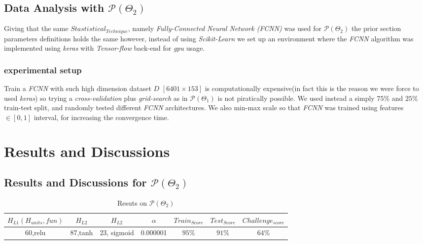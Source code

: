 \subsection{Data Analysis with $\mathcal{P}(\Theta_{2})$}

Giving that the same $Stastistical_{Technique}$, namely \emph{Fully-Connected Neural Network (FCNN)} was used for  $\mathcal{P}(\Theta_{2})$ the prior section parameters definitions holds the same however, instead of using \emph{Scikit-Learn} we set up an environment where the \emph{FCNN} algorithm was implemented using \emph{keras} with \emph{Tensor-flow} back-end for \emph{gpu} usage.

\subsubsection{experimental setup}
Train a \emph{FCNN} with such high dimension dataset $D$ $[6401 \times 153]$ is computationally expensive(in fact this is the reason we were force to used \emph{keras}) so trying a \emph{cross-validation} plus  \emph{grid-search} as in   $\mathcal{P}(\Theta_{1})$ is not piratically possible. We used instead a simply $75\%$ and $25\%$ train-test split, and randomly tested different \emph{FCNN} architectures. We also min-max scale so that \emph{FCNN} was trained using features $\in [0,1]$ interval, for increasing the convergence time.



\section{Results and Discussions}

\subsection{Results and Discussions for  $\mathcal{P}(\Theta_{2})$}

\begin{table}[h!]
	\begin{center}
		\begin{tabular}{||c c c c c c c||} 
			\hline
			$H_{L1}(H_{units},fun)$&$H_{L2}$&$H_{L2}$& $\alpha$ & $Train_{Score}$ & $Test_{Score}$  & $Challenge_{score}$  \\ [0.5ex] 
			\hline
			60,relu
			&
			87,tanh
			&
			23, sigmoid
			&0.000001& $95\%$ & $91\%$ & $64\%$  \\ 
			\hline
		\end{tabular}
		\caption{Resuts on $\mathcal{P}(\Theta_{2})$}
		\label{table:p2_result}
	\end{center}
\end{table}

